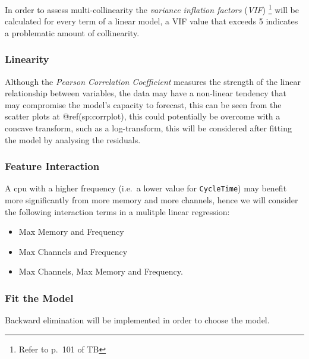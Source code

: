 \documentclass[12pt]{article}
\providecommand{\tightlist}{%
  \setlength{\itemsep}{0pt}\setlength{\parskip}{0pt}}
\let\rmarkdownfootnote\footnote%
\def\footnote{\protect\rmarkdownfootnote}
\begin{document}
In order to assess multi-collinearity the \emph{variance inflation
factors} (\emph{VIF}) \footnote{Refer to p.~101 of TB} will be
calculated for every term of a linear model, a VIF value that exceeds 5
indicates a problematic amount of collinearity.

\hypertarget{linearity}{%
\subsubsection{Linearity}\label{linearity}}

Although the \emph{Pearson Correlation Coefficient} measures the
strength of the linear relationship between variables, the data may have
a non-linear tendency that may compromise the model's capacity to
forecast, this can be seen from the scatter plots at @ref(sp:corrplot),
this could potentially be overcome with a concave transform, such as a
log-transform, this will be considered after fitting the model by
analysing the residuals.

\hypertarget{feature-interaction}{%
\subsubsection{Feature Interaction}\label{feature-interaction}}

A cpu with a higher frequency (i.e.~a lower value for
\texttt{CycleTime}) may benefit more significantly from more memory and
more channels, hence we will consider the following interaction terms in
a mulitple linear regression:

\begin{itemize}
\tightlist
\item
  Max Memory and Frequency
\item
  Max Channels and Frequency
\item
  Max Channels, Max Memory and Frequency.
\end{itemize}

\hypertarget{fit-the-model}{%
\subsubsection{Fit the Model}\label{fit-the-model}}

Backward elimination will be implemented in order to choose the model.
\end{document}

